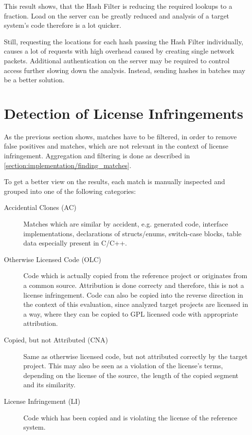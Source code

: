 This result shows, that the Hash Filter is reducing the required lookups to a fraction.
Load on the server can be greatly reduced and analysis of a target system's code therefore is a lot quicker.

Still, requesting the locations for each hash passing the Hash Filter individually, causes a lot of requests with high overhead caused by creating single network packets.
Additional authentication on the server may be required to control access further slowing down the analysis.
Instead, sending hashes in batches may be a better solution.

\section{Detection of License Infringements}\label{section:evaluation/detecting_infringements}
As the previous section shows, matches have to be filtered, in order to remove false positives and matches, which are not relevant in the context of license infringement.
Aggregation and filtering is done as described in \autoref{section:implementation/finding_matches}.

To get a better view on the results, each match is manually inspected and grouped into one of the following categories:
\begin{description}
	\item [Accidential Clones (AC)]
		Matches which are similar by \glqq accident\grqq, e.g. generated code, interface implementations, declarations of structs/enums, switch-case blocks, table data especially present in C/C++.
	\item[Otherwise Licensed Code (OLC)]
		Code which is actually copied from the reference project or originates from a common source.
		Attribution is done correcty and therefore, this is not a license infringement.
		Code can also be copied into the reverse direction in the context of this evaluation, since analyzed target projects are licensed in a way, where they can be copied to GPL licensed code with appropriate attribution.
	\item[Copied, but not Attributed (CNA)] 
		Same as otherwise licensed code, but not attributed correctly by the target project.
		This may also be seen as a violation of the license's terms, depending on the license of the source, the length of the copied segment and its similarity.
	\item[License Infringement (LI)]
		Code which has been copied and is violating the license of the reference system.
\end{description}

